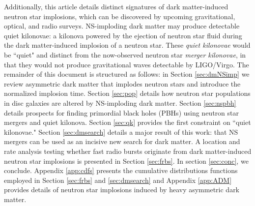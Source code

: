 \documentclass[nofootinbib,longbibliography,prd,floatfix,superscriptaddress,twocolumn]{revtex4-1}
\begin{document}
Additionally, this article details distinct signatures of dark matter-induced neutron star implosions, which can be discovered by upcoming gravitational, optical, and radio surveys. NS-imploding dark matter may produce detectable quiet kilonovae: a kilonova powered by the ejection of neutron star fluid during the dark matter-induced implosion of a neutron star. These \emph{quiet kilonovae} would be ``quiet" and distinct from the now-observed neutron star \emph{merger kilonovae}, in that they would not produce gravitational waves detectable by LIGO/Virgo. The remainder of this document is structured as follows: in Section \ref{sec:dmNSimp} we review asymmetric dark matter that implodes neutron stars and introduce the normalized implosion time. Section \ref{sec:pop} details how neutron star populations in disc galaxies are altered by NS-imploding dark matter. Section \ref{sec:nspbh} details prospects for finding primordial black holes (PBHs) using neutron star mergers and quiet kilonova.  Section \ref{sec:qk} provides the first constraint on ``quiet kilonovae." Section \ref{sec:dmsearch} details a major result of this work: that NS mergers can be used as an incisive new search for dark matter. A location and rate analysis testing whether fast radio bursts originate from dark matter-induced neutron star implosions is presented in Section \ref{sec:frbs}. In section \ref{sec:conc}, we conclude.  Appendix \ref{app:cdfs} presents the cumulative distributions functions employed in Section \ref{sec:frbs} and \ref{sec:dmsearch} and Appendix \ref{app:ADM} provides details of neutron star implosions induced by heavy asymmetric dark matter. 
\end{document}
